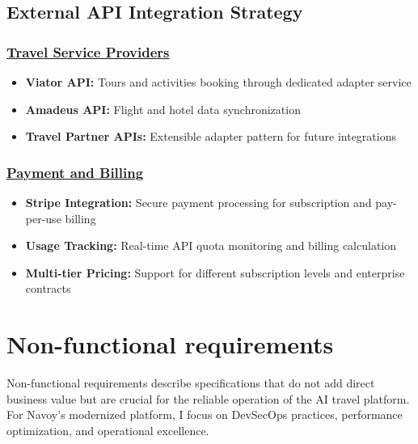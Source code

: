 \subsection{External API Integration Strategy}

\subsubsection*{\underline{Travel Service Providers}}
\begin{itemize}
    \item \textbf{Viator API:} Tours and activities booking through dedicated adapter service
    \item \textbf{Amadeus API:} Flight and hotel data synchronization
    \item \textbf{Travel Partner APIs:} Extensible adapter pattern for future integrations
\end{itemize}

\subsubsection*{\underline{Payment and Billing}}
\begin{itemize}
    \item \textbf{Stripe Integration:} Secure payment processing for subscription and pay-per-use billing
    \item \textbf{Usage Tracking:} Real-time API quota monitoring and billing calculation
    \item \textbf{Multi-tier Pricing:} Support for different subscription levels and enterprise contracts
\end{itemize}

\section{Non-functional requirements}
Non-functional requirements describe specifications that do not add direct business value but are crucial for the reliable operation of the AI travel platform.
For Navoy's modernized platform, I focus on DevSecOps practices, performance optimization, and operational excellence.

